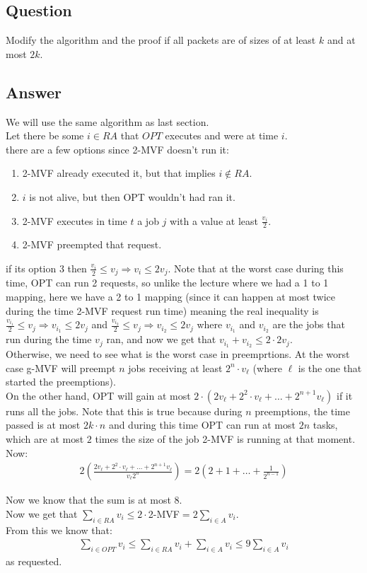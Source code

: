 \subsection*{Question}
Modify the algorithm and the proof if all packets are of sizes of at least $k$ and at most $2k$.

\subsection*{Answer}
We will use the same algorithm as last section.\\
Let there be some $i\in RA$ that $OPT$ executes and were at time $i$.\\
there are a few options since 2-MVF doesn't run it:
\begin{enumerate}
    \item 2-MVF already executed it, but that implies $i\notin RA$.
    \item $i$ is not alive, but then OPT wouldn't had ran it.
    \item 2-MVF executes in time $t$ a job $j$ with a value at least $\frac{v_i}{2}$.
    \item 2-MVF preempted that request. 
\end{enumerate}

if its option 3 then $\frac{v_i}{2} \leq v_j\Rightarrow v_i \leq 2v_j$. Note that at the worst case during this time, OPT can run 2 requests, so unlike the lecture where we had a 1 to 1 mapping, here we have a 2 to 1 mapping (since it can happen at most twice during the time 2-MVF request run time) meaning the real inequality is $\frac{v_{i_1}}{2} \leq v_j\Rightarrow v_{i_1} \leq 2v_j$ and $\frac{v_{i_2}}{2} \leq v_j\Rightarrow v_{i_2} \leq 2v_j$ where $v_{i_1}$ and $v_{i_2}$ are the jobs that run during the time $v_j$ ran, and now we get that $v_{i_1}+v_{i_2} \leq 2\cdot2v_j$.\\
Otherwise, we need to see what is the worst case in preemprtions. At the worst case g-MVF will preempt $n$ jobs receiving at least $2^n\cdot v_\ell$ (where $\ell$ is the one that started the preemptions).\\
On the other hand, OPT will gain at most $2\cdot\left(2v_\ell + 2^2\cdot v_\ell +\dots+2^{n+1}v_\ell\right)$ if it runs all the jobs. Note that this is true because during $n$ preemptions, the time passed is at most $2k\cdot n$ and during this time OPT can run at most $2n$ tasks, which are at most $2$ times the size of the job 2-MVF is running at that moment.\\
Now:
\begin{gather*}
    2\left(\frac{2v_\ell + 2^2\cdot v_\ell +\dots+2^{n+1}v_\ell}{v_\ell 2^n}\right) =
    2\left(2 + 1 + \dots +\frac{1}{2^{n-1}}\right)
\end{gather*}

Now we know that the sum is at most 8.\\
Now we get that $ \sum_{i\in RA} v_i \leq 2\cdot $2-MVF$ = 2 \sum_{i\in A}v_i$.\\
From this we know that:
\begin{gather*}
    \sum_{i\in OPT} v_i \leq \sum_{i\in RA} v_i + \sum_{i\in A} v_i \leq 9\sum_{i\in A} v_i
\end{gather*}
as requested.